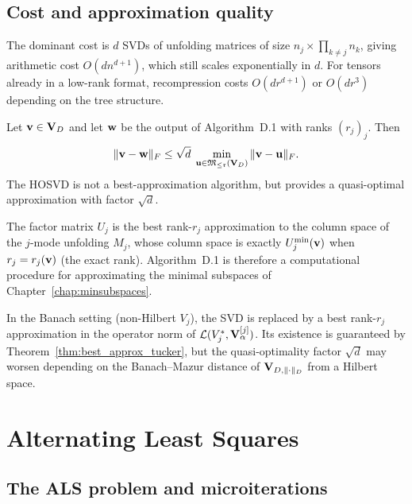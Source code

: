 \subsection*{Cost and approximation quality}

The dominant cost is $d$ SVDs of unfolding matrices of size
$n_j \times \prod_{k \neq j} n_k$, giving arithmetic cost
$O(dn^{d+1})$, which still scales exponentially in $d$.
For tensors already in a low-rank format, recompression costs
$O(dr^{d+1})$ or $O(dr^3)$ depending on the tree structure.

\begin{theorem}
\label{thm:app:hosvd}
Let $\mathbf{v} \in \mathbf{V}_D$ and let $\mathbf{w}$ be the output of \textup{Algorithm~D.1}
with ranks $(r_j)_j$. Then
\begin{equation}
\label{eq:app:hosvd_bound}
    \|\mathbf{v} - \mathbf{w}\|_F
    \leq \sqrt{d}\;
    \min_{\mathbf{u} \in \mathfrak{M}_{\leq\mathfrak{r}}(\mathbf{V}_D)} \|\mathbf{v} - \mathbf{u}\|_F.
\end{equation}
The HOSVD is not a best-approximation algorithm, but provides a
quasi-optimal approximation with factor $\sqrt{d}$.
\end{theorem}

\begin{remark}
\label{rem:app:hosvd_min}
The factor matrix $U_j$ is the best rank-$r_j$ approximation to
the column space of the $j$-mode unfolding $M_j$, whose column space
is exactly $U^{\min}_{j}(\mathbf{v})$ when $r_j = r_j(\mathbf{v})$ (the exact rank).
Algorithm~D.1 is therefore a computational procedure for approximating
the minimal subspaces of Chapter~\ref{chap:minsubspaces}.

In the Banach setting (non-Hilbert $V_j$), the SVD is replaced by a
best rank-$r_j$ approximation in the operator norm of
$\mathcal{L}(V_j^*,\mathbf{V}_\alpha^{[j]})$. Its existence is guaranteed by
Theorem~\ref{thm:best_approx_tucker}, but the quasi-optimality
factor $\sqrt{d}$ may worsen depending on the Banach--Mazur distance
of $\mathbf{V}_{D,\|\cdot\|_D}$ from a Hilbert space.
\end{remark}

\section{Alternating Least Squares}
\label{app:alg:als}

\subsection*{The ALS problem and microiterations}

